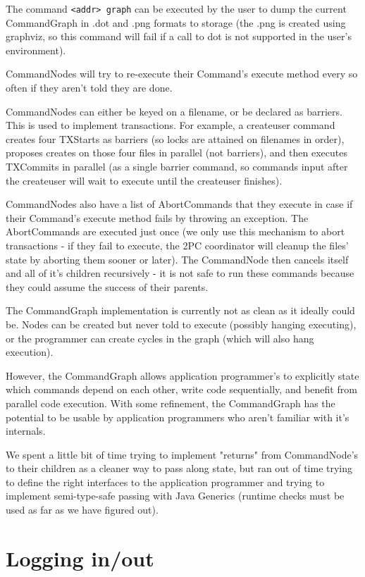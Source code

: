 \documentclass[11pt]{article}
\begin{document}
The command \verb=<addr> graph= can be executed by the user to dump the current CommandGraph in .dot and .png formats to storage
(the .png is created using graphviz, so this command will fail if a call to dot is not supported in the user's environment).

CommandNodes will try to re-execute their Command's execute method every so often if they aren't told they are done.

CommandNodes can either be keyed on a filename, or be declared as barriers. This is used to implement transactions.
For example, a createuser command creates four TXStarts as barriers (so locks are attained on filenames in order), proposes creates on those four
files in parallel (not barriers), and then executes TXCommits in parallel (as a single barrier command, so commands input after the createuser will
wait to execute until the createuser finishes).

CommandNodes also have a list of AbortCommands that they execute in case if their Command's execute method fails by throwing an exception.
The AbortCommands are executed just once (we only use this mechanism to abort transactions - if they fail to execute, the 2PC coordinator
will cleanup the files' state by aborting them sooner or later). The CommandNode then cancels itself and all of it's children recursively -
it is not safe to run these commands because they could assume the success of their parents.

The CommandGraph implementation is currently not as clean as it ideally could be. Nodes can be created but never told to execute
(possibly hanging executing), or the programmer can create cycles in the graph (which will also hang execution).

However, the CommandGraph allows application programmer's to explicitly state which commands depend on each other, write code sequentially,
and benefit from parallel code execution. With some refinement, the CommandGraph has the potential to be usable by application programmers who
aren't familiar with it's internals.

We spent a little bit of time trying to implement "returns" from CommandNode's to their children as a cleaner way to pass along state,
but ran out of time trying to define the right interfaces to the application programmer and trying to implement semi-type-safe passing
with Java Generics (runtime checks must be used as far as we have figured out).

\section{Logging in/out}
\end{document}
